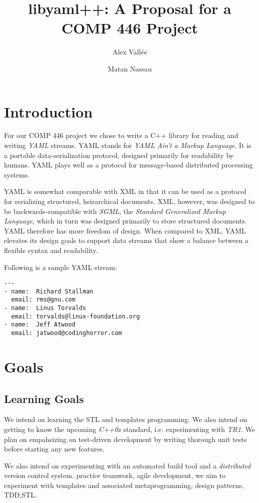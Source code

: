 \documentclass{article}
\author{Alex Vall\'ee \and Matan Nassau}
\title{libyaml++:  A Proposal for a COMP 446 Project}
\begin{document}
\maketitle

\section{Introduction}
For our COMP 446 project we chose to write a C++ library for reading and writing \emph{YAML} streams.  YAML stands for \emph{YAML Ain't a Markup Language}.  It is a portable data-serialization protocol, designed primarily for readability by humans.  YAML plays well as a protocol for message-based distributed processing systems.

YAML is somewhat comparable with XML in that it can be used as a protocol for serializing structured, heirarchical documents.  XML, however, was designed to be backwards-compatible with \emph{SGML}, the \emph{Standard Generalized Markup Language}, which in turn was designed primarily to store structured documents.  YAML therefore has more freedom of design.  When compared to XML, YAML elevates its design goals to support data streams that show a balance between a flexible syntax and readability.

Following is a sample YAML stream:

\begin{verbatim}
---
- name:  Richard Stallman
  email: rms@gnu.com
- name:  Linus Torvalds
  email: torvalds@linux-foundation.org
- name:  Jeff Atwood
  email: jatwood@codinghorror.com
\end{verbatim}

\section{Goals}

\subsection{Learning Goals}
We intend on learning the STL and templates programming. We also intend on getting to know the upcoming \emph{C++0x} standard, i.e. experimenting with \emph{TR1}.  We plan on empahsizing on test-driven development by writing thorough unit tests before starting any new features.

We also intend on experimenting with an automated build tool and a \emph{distributed} version control system.  practice teamwork, agile development, we aim to experiment with templates and associated metaprogramming, design patterns, TDD,STL.
\end{document}
